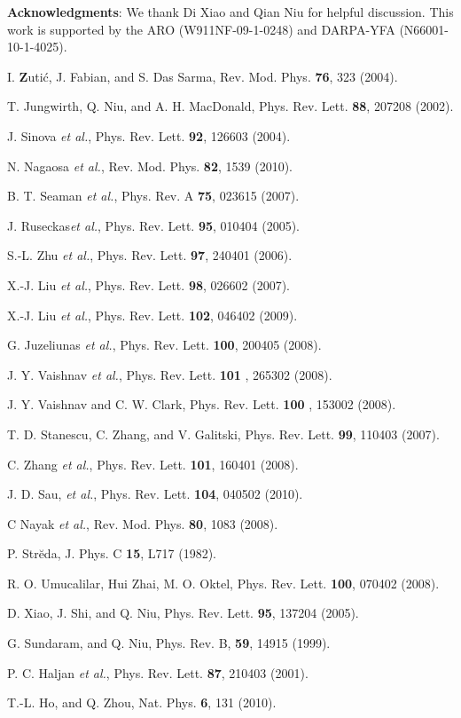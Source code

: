 \documentclass[pra,twocolumn,showpacs,floatfix]{revtex4-1}
\renewcommand{\v}[1]{{\bf #1}}
\begin{document}
\textbf{Acknowledgments}: We thank Di Xiao and Qian Niu for helpful
discussion. This work is supported by the ARO (W911NF-09-1-0248) and
DARPA-YFA (N66001-10-1-4025).

\begin{thebibliography}{99}
 I. \v{Z}uti\'{c}, J. Fabian, and S. Das Sarma, Rev. Mod.
Phys. \textbf{76}, 323 (2004).

 T. Jungwirth, Q. Niu, and A. H. MacDonald, Phys. Rev. Lett.
\textbf{88}, 207208 (2002).

 J. Sinova \textit{et al.}, Phys. Rev. Lett. \textbf{92},
126603 (2004).

 N. Nagaosa \textit{et al.}, Rev. Mod. Phys. \textbf{82},
1539 (2010).

 B. T. Seaman \textit{et al.}, Phys. Rev. A \textbf{75},
023615 (2007).

 J. Ruseckas\textit{et al.}, Phys. Rev. Lett. \textbf{95},
010404 (2005).

 S.-L. Zhu \textit{et al.}, Phys. Rev. Lett. \textbf{97},
240401 (2006).

 X.-J. Liu \textit{et al.}, Phys. Rev. Lett. \textbf{98},
026602 (2007).

 X.-J. Liu \textit{et al.}, Phys. Rev. Lett. \textbf{102},
046402 (2009).

 G. Juzeliunas \textit{et al.}, Phys. Rev. Lett. \textbf{%
100}, 200405 (2008).

 J. Y. Vaishnav \textit{et al.}, Phys. Rev. Lett. \textbf{101%
}, 265302 (2008).

 J. Y. Vaishnav and C. W. Clark, Phys. Rev. Lett. \textbf{100%
}, 153002 (2008).

 T. D. Stanescu, C. Zhang, and V. Galitski, Phys. Rev. Lett.
\textbf{99}, 110403 (2007).

 C. Zhang \textit{et al.}, Phys. Rev. Lett. \textbf{101},
160401 (2008).

 J. D. Sau, \textit{et al.}, Phys. Rev. Lett. \textbf{104},
040502 (2010).

 C Nayak \textit{et al.}, Rev. Mod. Phys. \textbf{80}, 1083
(2008).

 P. Str\u{e}da, J. Phys. C \textbf{15}, L717 (1982).

 R. O. Umucalilar, Hui Zhai, M. O. Oktel, Phys. Rev. Lett.
\textbf{100}, 070402 (2008).

 D. Xiao, J. Shi, and Q. Niu, Phys. Rev. Lett. \textbf{95},
137204 (2005).

 G. Sundaram, and Q. Niu, Phys. Rev. B, \textbf{59}, 14915
(1999).

 P. C. Haljan \textit{et al.}, Phys. Rev. Lett. \textbf{87},
210403 (2001).

 T.-L. Ho, and Q. Zhou, Nat. Phys. \textbf{6}, 131 (2010).
\end{thebibliography}
\end{document}
